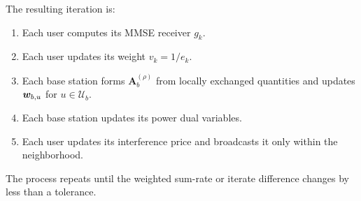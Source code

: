 The resulting iteration is:
\begin{enumerate}
  \item Each user computes its MMSE receiver $g_k$.
  \item Each user updates its weight $v_k = 1 / e_k$.
  \item Each base station forms $\mathbf{A}_b^{(\rho)}$ from locally exchanged quantities and updates $\boldsymbol{w}_{b,u}$ for $u \in \mathcal{U}_b$.
  \item Each base station updates its power dual variables.
  \item Each user updates its interference price and broadcasts it only within the neighborhood.
\end{enumerate}
The process repeats until the weighted sum-rate or iterate difference changes by less than a tolerance.
